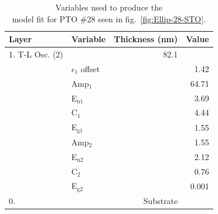 \begin{table}[htbp]
	\centering
	\caption[PTO \#28 Ellipsometric Model Variables]{Variables used to produce the\\model fit for PTO \#28 seen in fig.~\vref{fig:Ellip-28-STO}. \label{tbl:PTO-28-ellip-variables}}
	\begin{tabular}{l l r r}
	\toprule
	Layer&Variable&Thickness (nm)&Value\\
	\midrule
	1. T-L Osc. (2)&&82.1&\\
	&$\epsilon_{1}$ offset&&1.42\\
	&Amp$_{1}$&&64.71\\
	&E$_{\mathrm{n 1}}$&&3.69\\
	&C$_{1}$&&4.44\\
	&E$_{\mathrm{g1}}$&&1.55\\
	&Amp$_{2}$&&1.55\\
	&E$_{\mathrm{n 2}}$&&2.12\\
	&C$_{2}$&&0.76\\
	&E$_{\mathrm{g2}}$&&0.001\\
	0. \ce{STO}&&Substrate&\\
	\bottomrule
	\end{tabular}
\end{table}


